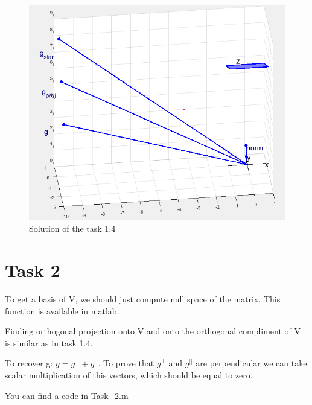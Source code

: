 \documentclass[12pt]{article}
\begin{document}
\begin{figure}[!h]
    \centering
    \includegraphics[scale=0.35]{Task_1_4.png}
    \caption{Solution of the task 1.4}
    \label{fig:my_label}
\end{figure}

\section{Task 2}
To get a basis of V, we should just compute null space of the matrix. This function is available in matlab.

Finding orthogonal projection onto V  and onto the orthogonal compliment of V is similar as in task 1.4.

To recover g: $g = g^{\perp} + g^{||}$. To prove that $g^{\perp}$ and $g^{||}$ are perpendicular we can take scalar multiplication of this vectors, which should be equal to zero.

You can find a code in Task\string_2.m
\end{document}
